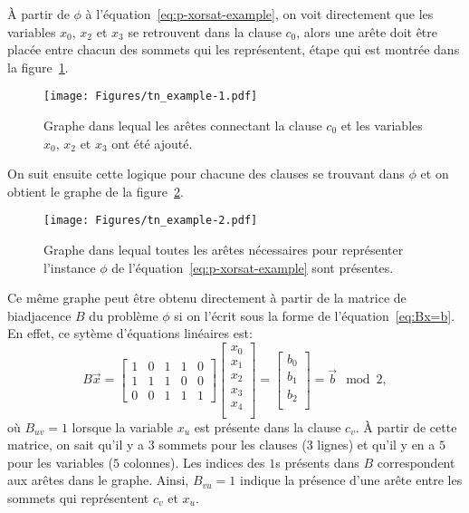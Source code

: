 À partir de $\phi$ à l'équation~\ref{eq:p-xorsat-example}, on voit directement que les variables $x_0$, $x_2$ et $x_3$ se retrouvent dans la clause $c_0$, alors une arête doit être placée entre chacun des sommets qui les représentent, étape qui est montrée dans la figure~\ref{fig:tn-example1}.
\begin{figure}[h]
    \centering
    \texttt{[image: Figures/tn\_example-1.pdf]}
    \caption{Graphe dans lequal les arêtes connectant la clause $c_0$ et les variables $x_0$, $x_2$ et $x_3$ ont été ajouté.}
    \label{fig:tn-example1}
\end{figure}
On suit ensuite cette logique pour chacune des clauses se trouvant dans $\phi$ et on obtient le graphe de la figure~\ref{fig:tn-example2}.
\begin{figure}[h]
    \centering
    \texttt{[image: Figures/tn\_example-2.pdf]}
    \caption{Graphe dans lequal toutes les arêtes nécessaires pour représenter l'instance $\phi$ de l'équation~\ref{eq:p-xorsat-example} sont présentes.}
    \label{fig:tn-example2}
\end{figure}
Ce même graphe peut être obtenu directement à partir de la matrice de biadjacence $B$ du problème $\phi$ si on l'écrit sous la forme de l'équation~\ref{eq:Bx=b}.
En effet, ce sytème d'équations linéaires est:
\begin{equation}
    B\vec{x} = \begin{bmatrix}
        1 & 0 & 1 & 1 & 0 \\
        1 & 1 & 1 & 0 & 0 \\
        0 & 0 & 1 & 1 & 1
    \end{bmatrix}\begin{bmatrix}
        x_0\\
        x_1\\
        x_2\\
        x_3\\
        x_4\\
    \end{bmatrix} = \begin{bmatrix}
        b_0\\
        b_1\\
        b_2\\
    \end{bmatrix} = \vec{b} \mod{2},
\end{equation}
où $B_{uv} = 1$ lorsque la variable $x_u$ est présente dans la clause $c_v$.
À partir de cette matrice, on sait qu'il y a $3$ sommets pour les clauses ($3$ lignes) et qu'il y en a $5$ pour les variables ($5$ colonnes).
Les indices des $1$s présents dans $B$ correspondent aux arêtes dans le graphe.
Ainsi, $B_{vu} = 1$ indique la présence d'une arête entre les sommets qui représentent $c_v$ et $x_u$.

